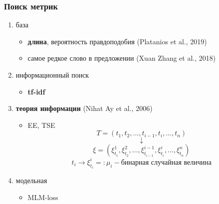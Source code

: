 \documentclass{beamer}
\begin{document}
\begin{frame}
	\frametitle{Поиск метрик}
	\begin{enumerate}
		\item  база
		\begin{itemize}
			\item {\bf длина}, вероятность правдоподобия (Platanios et al., 2019)
			\item самое редкое слово в предложении (Xuan Zhang et al., 2018)
		\end{itemize}
		\item информационный поиск
		\begin{itemize}
			\item {\bf tf-idf}
		\end{itemize}
		\item {\bf теория информации} (Nihat Ay et al., 2006)
		\begin{itemize}
			\item EE, TSE
				\[
				T=(t_1, t_2, \ldots, t_{i-1},t_i,\ldots, t_n)
				\]
				\[
				\downarrow
				\]
				\[
				\xi=(\xi^1_{t_1},\xi^2_{t_2},\ldots,\xi^{i-1}_{t_{i-1}},\xi^i_{t_i},\ldots,\xi^n_{t_n})
				\]
				\[
				t_i\rightarrow \xi^i_{t_i} =: \mu_i - \text{бинарная случайная величина}
				\]
		\end{itemize}
		\item модельная
		\begin{itemize}
			\item MLM-loss
		\end{itemize}
	\end{enumerate}
\end{frame}
\end{document}
